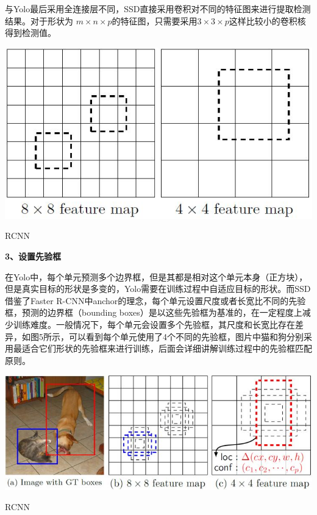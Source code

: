与Yolo最后采用全连接层不同，SSD直接采用卷积对不同的特征图来进行提取检测结果。对于形状为 $m\times n \times p $的特征图，只需要采用$ 3\times 3 \times p $这样比较小的卷积核得到检测值。 
\begin{uscfigure}
	\includegraphics[width=\textwidth]{./Pictures/ssd_(2).jpg}	
	\caption{RCNN}
\end{uscfigure}
\textbf{3、设置先验框 }

在Yolo中，每个单元预测多个边界框，但是其都是相对这个单元本身（正方块），但是真实目标的形状是多变的，Yolo需要在训练过程中自适应目标的形状。而SSD借鉴了Faster R-CNN中anchor的理念，每个单元设置尺度或者长宽比不同的先验框，预测的边界框（bounding boxes）是以这些先验框为基准的，在一定程度上减少训练难度。一般情况下，每个单元会设置多个先验框，其尺度和长宽比存在差异，如图5所示，可以看到每个单元使用了4个不同的先验框，图片中猫和狗分别采用最适合它们形状的先验框来进行训练，后面会详细讲解训练过程中的先验框匹配原则。
\begin{uscfigure}
	\includegraphics[width=\textwidth]{./Pictures/ssd_(3).jpg}	
	\caption{RCNN}
\end{uscfigure}